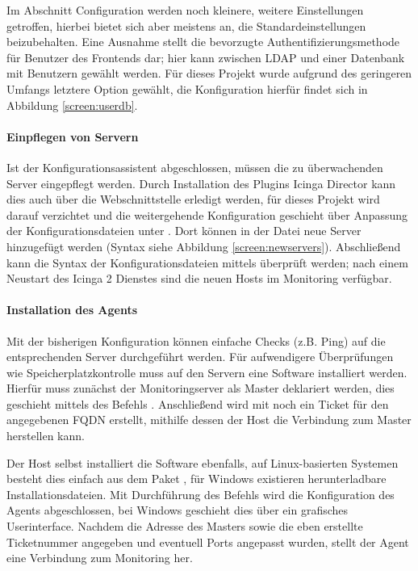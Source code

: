 Im Abschnitt \glqq{}Configuration\grqq{} werden noch kleinere, weitere Einstellungen getroffen, hierbei bietet sich aber meistens an, die Standardeinstellungen beizubehalten. Eine Ausnahme stellt die bevorzugte Authentifizierungsmethode für Benutzer des Frontends dar; hier kann zwischen LDAP und einer Datenbank mit Benutzern gewählt werden. Für dieses Projekt wurde aufgrund des geringeren Umfangs letztere Option gewählt, die Konfiguration hierfür findet sich in Abbildung \ref{screen:userdb}.

\paragraph{Einpflegen von Servern}
Ist der Konfigurationsassistent abgeschlossen, müssen die zu überwachenden Server eingepflegt werden. Durch Installation des Plugins \glqq{}Icinga Director\grqq{} kann dies auch über die Webschnittstelle erledigt werden, für dieses Projekt wird darauf verzichtet und die weitergehende Konfiguration geschieht über Anpassung der Konfigurationsdateien unter . Dort können in der Datei  neue Server hinzugefügt werden (Syntax siehe Abbildung \ref{screen:newservers}). Abschließend kann die Syntax der Konfigurationsdateien mittels  überprüft werden; nach einem Neustart des \glqq{}Icinga 2\grqq{} Dienstes sind die neuen Hosts im Monitoring verfügbar.

\paragraph{Installation des Agents}
Mit der bisherigen Konfiguration können einfache Checks (z.B. Ping) auf die entsprechenden Server durchgeführt werden. Für aufwendigere Überprüfungen wie Speicherplatzkontrolle muss auf den Servern eine Software installiert werden. Hierfür muss zunächst der Monitoringserver als \glqq{}Master\grqq{} deklariert werden, dies geschieht mittels des Befehls . Anschließend wird mit  noch ein \glqq{}Ticket\grqq{} für den angegebenen FQDN erstellt, mithilfe dessen der Host die Verbindung zum Master herstellen kann.

Der Host selbst installiert die Software ebenfalls, auf Linux-basierten Systemen besteht dies einfach aus dem Paket , für Windows existieren herunterladbare Installationsdateien. Mit Durchführung des Befehls  wird die Konfiguration des Agents abgeschlossen, bei Windows geschieht dies über ein grafisches Userinterface. Nachdem die Adresse des Masters sowie die eben erstellte Ticketnummer angegeben und eventuell Ports angepasst wurden, stellt der Agent eine Verbindung zum Monitoring her.

